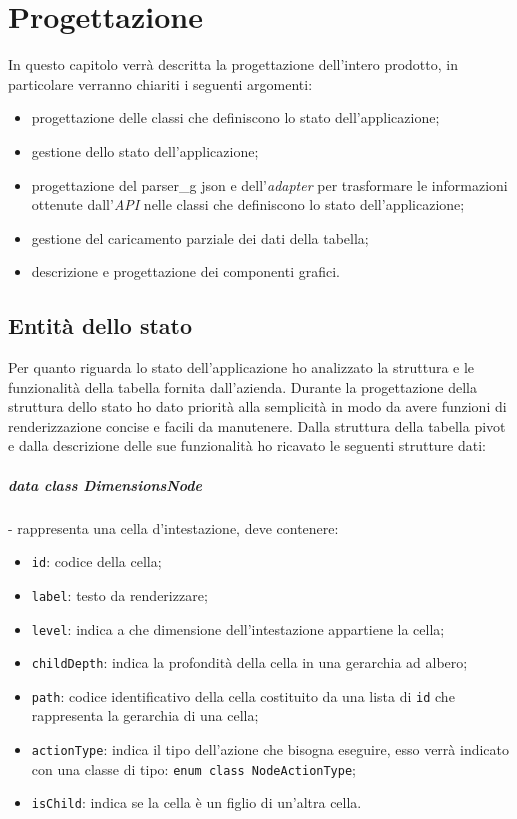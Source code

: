 
\chapter{Progettazione}
\label{cap:progettazione}

In questo capitolo verrà descritta la progettazione dell'intero prodotto, in particolare verranno chiariti i seguenti argomenti:
\begin{itemize}
	\item progettazione delle classi che definiscono lo stato dell'applicazione;
	\item gestione dello stato dell'applicazione;
	\item progettazione del \gls{parser_g} json e dell'\emph{adapter} per trasformare le informazioni ottenute dall'\emph{API} nelle classi che definiscono lo stato dell'applicazione;
	\item gestione del caricamento parziale dei dati della tabella;
	\item descrizione e progettazione dei componenti grafici.
\end{itemize}

\section{Entità dello stato}
Per quanto riguarda lo stato dell'applicazione ho analizzato la struttura e le funzionalità della tabella fornita dall'azienda. Durante la progettazione della struttura dello stato ho dato priorità alla semplicità in modo da avere funzioni di renderizzazione concise e facili da manutenere. Dalla struttura della tabella pivot e dalla descrizione delle sue funzionalità ho ricavato le seguenti strutture dati:

\paragraph*{data class DimensionsNode}- rappresenta una cella d'intestazione, deve contenere:
\begin{itemize}
	\item \verb|id|: codice della cella;
	\item \verb|label|: testo da renderizzare;
	\item \verb|level|: indica a che dimensione dell'intestazione appartiene la cella;
	\item \verb|childDepth|: indica la profondità della cella in una gerarchia ad albero;
	\item \verb|path|: codice identificativo della cella costituito da una lista di \verb|id| che rappresenta la gerarchia di una cella;
	\item \verb|actionType|: indica il tipo dell'azione che bisogna eseguire, esso verrà indicato con una classe di tipo: \verb|enum class NodeActionType|;
	\item \verb|isChild|: indica se la cella è un figlio di un'altra cella.
\end{itemize}

